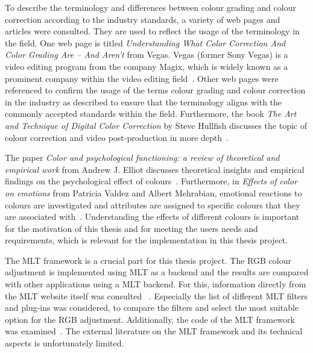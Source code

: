 \documentclass[../MasterThesis.tex]{subfiles}
\begin{document}
\begin{description}[font=\color{RedViolet!80!black}, style=nextline]
		To describe the terminology and differences between colour grading and colour correction according to the industry standards, a variety of web pages and articles were consulted. They are used to reflect the usage of the terminology in the field. 
		One web page is titled \textit{Understanding What Color Correction And Color Grading Are – And Aren’t} from Vegas. Vegas (former Sony Vegas) is a video editing program from the company Magix, which is widely known as a prominent company within the video editing field~\cite{cc_cg_1}.
		Other web pages were referenced to confirm the usage of the terms colour grading and colour correction in the industry as described to ensure that the terminology aligns with the commonly accepted standards within the field. 
		Furthermore, the book \textit{The Art and Technique of Digital Color Correction} by Steve Hullfish discusses the topic of colour correction and video post-production in more depth~\cite{cc1}.
		
		
		
		\item[Effects of different colour]
		
		
		The paper \textit{Color and psychological functioning: a review of theoretical and empirical work} from Andrew J. Elliot discusses theoretical insights and empirical findings on the psychological effect of colours~\cite{colour}.
		Furthermore, in \textit{Effects of color on emotions} from Patricia Valdez and Albert Mehrabian, emotional reactions to colours are investigated and attributes are assigned to specific colours that they are associated with~\cite{colour2}.
		Understanding the effects of different colours is important for the motivation of this thesis and for meeting the users needs and requirements, which is relevant for the implementation in this thesis project.
		

		
	
		
		
		\item[MLT framework]
		
		
		The MLT framework is a crucial part for this thesis project. 
		The RGB colour adjustment is implemented using MLT as a backend and the results are compared with other applications using a MLT backend.
		For this, information directly from the MLT website itself was consulted~\cite{melt} .
		Especially the list of different MLT filters and plug-ins was considered, to compare the filters and select the most suitable option for the RGB adjustment.
		Additionally, the code of the MLT framework was examined~\cite{melt_filters, melt_code}.
		The external literature on the MLT framework and its technical aspects is unfortunately limited.
		

\end{description}
\end{document}
